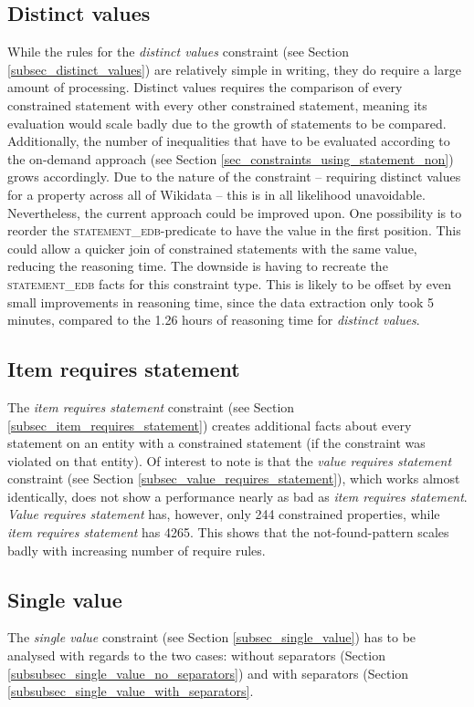 \documentclass[hyperref,bachelorofscience,fleqn]{cgvpub}
\begin{document}
\subsection{Distinct values}
While the rules for the \emph{distinct values} constraint (see Section \ref{subsec_distinct_values}) are relatively simple in writing, they do require a large amount of processing. Distinct values requires the comparison of every constrained statement with every other constrained statement, meaning its evaluation would scale badly due to the growth of statements to be compared. Additionally, the number of inequalities that have to be evaluated according to the on-demand approach (see Section \ref{sec_constraints_using_statement_non}) grows accordingly. Due to the nature of the constraint -- requiring distinct values for a property across all of Wikidata -- this is in all likelihood unavoidable. Nevertheless, the current approach could be improved upon. One possibility is to reorder the \textsc{statement\_edb}-predicate to have the value in the first position. This could allow a quicker join of constrained statements with the same value, reducing the reasoning time. The downside is having to recreate the \textsc{statement\_edb} facts for this constraint type. This is likely to be offset by even small improvements in reasoning time, since the data extraction only took 5 minutes, compared to the 1.26 hours of reasoning time for \emph{distinct values}.

\subsection{Item requires statement}\label{subsec_findings_item_requires_statement}
The \emph{item requires statement} constraint (see Section \ref{subsec_item_requires_statement}) creates additional facts about every statement on an entity with a constrained statement (if the constraint was violated on that entity). Of interest to note is that the \emph{value requires statement} constraint (see Section \ref{subsec_value_requires_statement}), which works almost identically, does not show a performance nearly as bad as \emph{item requires statement}. \emph{Value requires statement} has, however, only 244 constrained properties, while \emph{item requires statement} has 4265. This shows that the not-found-pattern scales badly with increasing number of require rules.

\subsection{Single value}
The \emph{single value} constraint (see Section \ref{subsec_single_value}) has to be analysed with regards to the two cases: without separators (Section \ref{subsubsec_single_value_no_separators}) and with separators (Section \ref{subsubsec_single_value_with_separators}.
\end{document}
